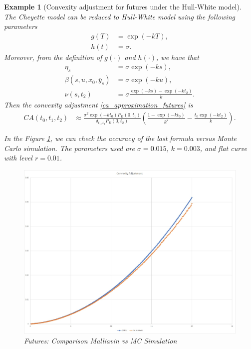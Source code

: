 \documentclass[a4paper,10pt]{article}
\newtheorem{example}[theorem]{Example}
\newcommand{\1}{\mathbf{1}}
\begin{document}
\begin{example}[Convexity adjustment for futures under the Hull-White model]\label{example_ca_future}
The Cheyette model can be reduced to Hull-White model using the following parameters
\begin{align*}
g(T) &= \exp(-kT), \\
h(t) &= \sigma.
\end{align*}
Moreover, from the definition of $g(\cdot)$ and $h(\cdot)$, we have that
\begin{align*}
\eta_s &= \sigma \exp(-ks),\\
\beta(s,u, x_0, \bar{y}_s) &= \sigma \exp(-ku),\\
\nu(s,t_2) &= \sigma \frac{\exp(-ks) - \exp(-kt_2)}{k}.
\end{align*}
Then the convexity adjustment \eqref{ca_approximation_futures} is
\begin{align*}
CA(t_0,t_1, t_2) & \approx \frac{\sigma^{2} \exp(-k t_0)  P_{E}(0,t_1)}{\delta_{t_1,t_2} P_{E}(0,t_2)} \left(\frac{1 - \exp(- k t_0)}{k^{2}} - \frac{t_0 \exp(-k t_2)}{k} \right).   
\end{align*}

In the Figure \ref{fig:Futures}, we can check the accuracy of the last formula versus Monte Carlo simulation. The parameters used are $\sigma=0.015$, $k=0.003$, and flat curve with level $r=0.01$.

\begin{figure}[H]
	\begin{center}
		\includegraphics[scale=0.3]{Figures/future_convexity.jpg}
	\end{center}
	\caption{Futures: Comparison Malliavin vs MC Simulation}
	\label{fig:Futures}
\end{figure} 
\end{example}
\end{document}
